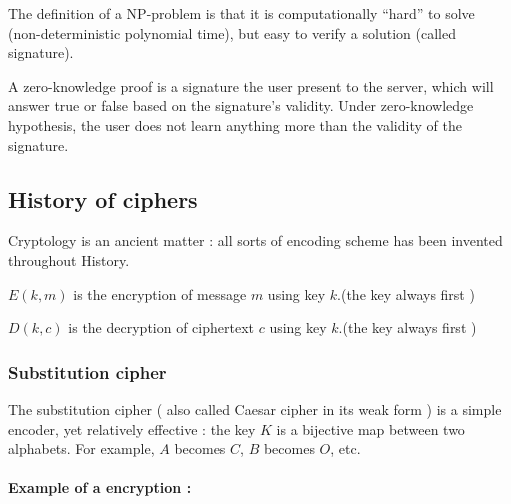 The definition of a NP-problem is that it is computationally ``hard'' to solve (non-deterministic polynomial time), but easy to verify a solution (called signature).

A zero-knowledge proof is a signature the user present to the server, which will answer true or false based on the signature's validity. Under zero-knowledge hypothesis, the user does not learn anything more than the validity of the signature.

\subsection{History of ciphers}

Cryptology is an ancient matter : all sorts of encoding scheme has been invented throughout History. 

\begin{mydef}
	$E(k,m)$ is the encryption of message $m$ using key $k$.(the key always first ) 
\end{mydef}
\begin{mydef}
	$D(k,c)$ is the decryption of ciphertext $c$ using key $k$.(the key always first ) 
\end{mydef}

\subsubsection{Substitution cipher }
The substitution cipher ( also called Caesar cipher in its weak form ) is a simple encoder, yet relatively effective : the key $K$ is a bijective map between two alphabets. For example, $A$ becomes $C$, $B$ becomes $O$, etc.\\

\begin{table}[h!]
    \centering
	\caption{Exemple of a substitution table}
	\label{tab:SubstitionTable}
\end{table}

\paragraph{Example of a encryption : \\}

